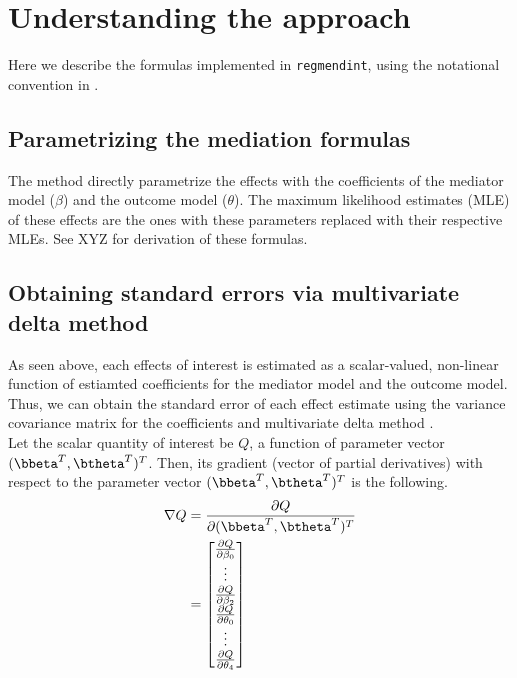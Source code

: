 \documentclass[dvipdfmx,10pt]{article}
\begin{document}
\section{Understanding the approach}
\label{sec:org85129df}
Here we describe the formulas implemented in \texttt{regmendint}, using the notational convention in \cite{vanderweeleExplanationCausalInference2015,valeriMediationAnalysisAllowing2013,valeriSASMacroCausal2015}.

\subsection{Parametrizing the mediation formulas}
\label{sec:org2c5b2ac}
The method directly parametrize the effects with the coefficients of the mediator model (\(\beta\)) and the outcome model (\(\theta\)). The maximum likelihood estimates (MLE) of these effects are the ones with these parameters replaced with their respective MLEs. See XYZ for derivation of these formulas.\\

\subsection{Obtaining standard errors via multivariate delta method}
\label{sec:org6f01426}

As seen above, each effects of interest is estimated as a scalar-valued, non-linear function of estiamted coefficients for the mediator model and the outcome model. Thus, we can obtain the standard error of each effect estimate using the variance covariance matrix for the coefficients and multivariate delta method \cite{hoefWhoInventedDelta2012}.\\

Let the scalar quantity of interest be \(Q\), a function of parameter vector \((\bbeta^{T},\btheta^{T})^{T}\). Then, its gradient (vector of partial derivatives) with respect to the parameter vector \((\bbeta^{T},\btheta^{T})^{T}\) is the following.\\

\begin{align*}
\nabla Q &= \frac{\partial Q}{\partial (\bbeta^{T},\btheta^{T})^{T}}\\
         &= \begin{bmatrix}
           \frac{\partial Q}{\partial \beta_{0}}\\
           \vdots\\
           \frac{\partial Q}{\partial \beta_{2}}\\
           \frac{\partial Q}{\partial \theta_{0}}\\
           \vdots\\
           \frac{\partial Q}{\partial \theta_{4}}\\
         \end{bmatrix}\\
\end{align*}
\end{document}
